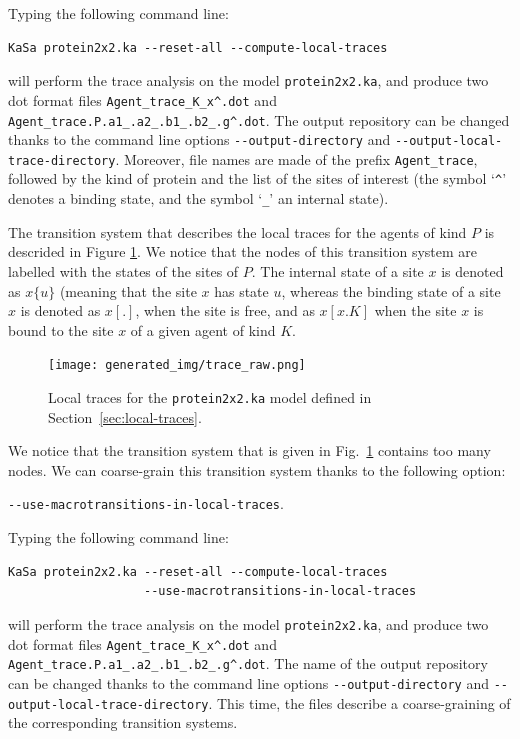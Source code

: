 \documentclass[11pt]{book}
\def\ttt#1{\texttt{#1}}
\begin{document}
Typing the following command line:

\begin{verbatim}
KaSa protein2x2.ka --reset-all --compute-local-traces
\end{verbatim}

will perform the trace analysis on the model \texttt{protein2x2.ka}, and produce
two dot format files \texttt{Agent\_trace\_K\_x\string^.dot} and \texttt{Agent\_trace.P.a1\_.a2\_.b1\_.b2\_.g\string^.dot}. The  output repository can be changed thanks to the command line options \texttt{-{}-output-directory} and \texttt{-{}-output-local-trace-directory}. Moreover, file names are made of the prefix \texttt{Agent\_trace}, followed by  the kind of protein and the list of the sites of interest (the symbol `\texttt{\string^}' denotes a binding state, and the symbol `\texttt{\_}' an internal state).

The transition system that describes the local traces for the agents of kind $P$ is descrided in Figure \ref{fig:trace-raw}. We notice that the nodes of this transition system are labelled with the states of the sites of $P$. The internal state of a site $x$ is denoted as $x\{u\}$ (meaning that the site $x$ has state $u$, whereas the binding state of a site $x$ is denoted as $x[.]$, when the site is free, and as $x[x.K]$ when the site $x$ is bound to the site $x$ of a given agent of kind $K$.

\begin{figure}[htbp]
\centering
\texttt{[image: generated\_img/trace\_raw.png]}
\caption{Local traces for the \ttt{protein2x2.ka} model defined in Section~\ref{sec:local-traces}.}
\label{fig:trace-raw}
\end{figure}

We notice that the transition system that is given in Fig.~\ref{fig:trace-raw}  contains too many nodes. We can coarse-grain this transition system thanks to the following option:
\begin{center}
\texttt{-{}-use-macrotransitions-in-local-traces}.
\end{center}
Typing the following command line:

\begin{verbatim}
KaSa protein2x2.ka --reset-all --compute-local-traces
                   --use-macrotransitions-in-local-traces
\end{verbatim}

will perform the trace analysis on the model \texttt{protein2x2.ka}, and produce
two dot format files \texttt{Agent\_trace\_K\_x\string^.dot} and \texttt{Agent\_trace.P.a1\_.a2\_.b1\_.b2\_.g\string^.dot}. The name of the output repository can be changed thanks to the command line options \texttt{-{}-output-directory} and \texttt{-{}-output-local-trace-directory}.
This time, the files describe a coarse-graining of the corresponding transition systems.
\end{document}
